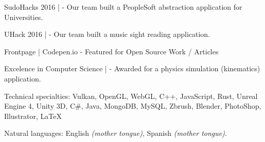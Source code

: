 \documentclass[10pt,a4paper]{article}
\begin{document}
\spacedhrule{0.5em}{-0.4em} %



\inlineheadsection %
{SudoHacks 2016 | }
{ - Our team built a PeopleSoft abstraction application for Universities.}

\inlineheadsection %
{UHack 2016 | }
{ - Our team built a music sight reading application.}

\inlineheadsection %
{Frontpage  | Codepen.io}
{ - Featured for Open Source Work / Articles}

\inlineheadsection %
{Excelence in Computer Science | }
{ - Awarded for a physics simulation (kinematics) application.}


\spacedhrule{1.6em}{-0.4em} %



\inlineheadsection %
{Technical specialties:}
{Vulkan, OpenGL, WebGL, C++, JavaScript, Rust, Unreal Engine 4, Unity 3D, C\#, Java, MongoDB, MySQL, Zbrush, Blender, PhotoShop, Illustrator, LaTeX}


\inlineheadsection %
{Natural languages:}
{English \textit{(mother tongue)}, Spanish \textit{(mother tongue)}.}


\spacedhrule{1.6em}{-0.4em} %
\end{document}
